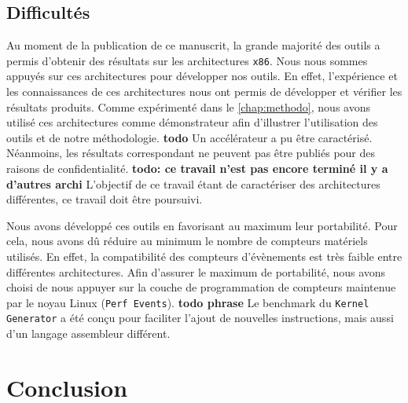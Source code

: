  
    \subsection{Difficultés}
        
        
        
        Au moment de la publication de ce manuscrit, la grande majorité des outils a permis d'obtenir des résultats sur les architectures \verb|x86|. Nous nous sommes appuyés sur ces architectures pour développer nos outils. En effet, l'expérience et les connaissances de ces architectures nous ont permis de développer et vérifier les résultats produits. Comme expérimenté dans le \autoref{chap:methodo}, nous avons utilisé ces architectures comme démonstrateur afin d'illustrer l'utilisation des outils et de notre méthodologie. \textbf{todo }Un accélérateur a pu être caractérisé. Néanmoins, les résultats correspondant ne peuvent pas être publiés pour des raisons de confidentialité. \textbf{todo: ce travail n'est pas encore terminé il y a d'autres archi} L'objectif de ce travail étant de caractériser des architectures différentes, ce travail doit être poursuivi. 
        
        Nous avons développé ces outils en favorisant au maximum leur portabilité. Pour cela, nous avons dû réduire au minimum le nombre de compteurs matériels utilisés. En effet, la compatibilité des compteurs d'évènements est très faible entre différentes architectures. Afin d'assurer le maximum de portabilité, nous avons choisi de nous appuyer sur la couche de programmation de compteurs maintenue par le noyau Linux (\verb|Perf Events|). \textbf{todo phrase} Le benchmark du \verb|Kernel Generator| a été conçu pour faciliter l'ajout de nouvelles instructions, mais aussi d'un langage assembleur différent.


\section{Conclusion}
    
